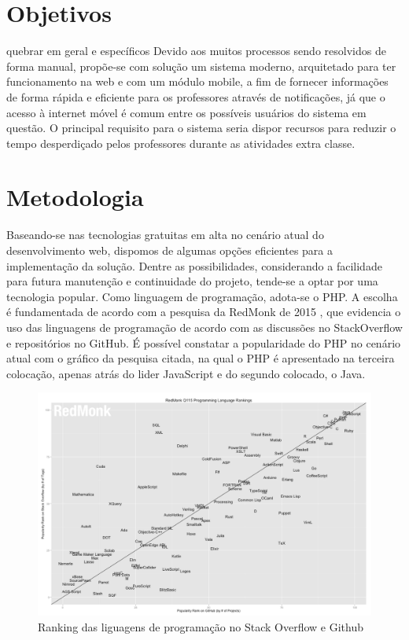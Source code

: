 \section{Objetivos} %

quebrar em geral e específicos
Devido aos muitos processos sendo resolvidos de forma manual, propõe-se com solução um sistema moderno, arquitetado para ter funcionamento na web e com um módulo mobile, a fim de fornecer informações de forma rápida e eficiente para os professores através de notificações, já que o acesso à internet móvel é comum entre os possíveis usuários do sistema em questão.
O principal requisito para o sistema seria dispor recursos para reduzir o tempo desperdiçado pelos professores durante as atividades extra classe.


\section{Metodologia} %


Baseando-se nas tecnologias gratuitas em alta no cenário atual do desenvolvimento web, dispomos de algumas opções eficientes para a implementação da solução. Dentre as possibilidades, considerando a facilidade para futura manutenção e continuidade do projeto, tende-se a optar por uma tecnologia popular. Como linguagem de programação, adota-se o PHP. A escolha é fundamentada de acordo com a pesquisa da RedMonk de 2015 \cite{Grafico-RedMonk} , que evidencia o uso das linguagens de programação de acordo com as discussões no StackOverflow e repositórios no GitHub. É possível constatar a popularidade do PHP no cenário atual com o gráfico da pesquisa citada, na qual o PHP é apresentado na terceira colocação, apenas atrás do lider JavaScript e do segundo colocado, o Java.

\begin{figure}
	\label{fig:graficoRedmonk}
	\includegraphics[width=1\textwidth]{img/grafico_redmonk}
	\caption{Ranking das liguagens de programação no Stack Overflow e Github}
\end{figure}


